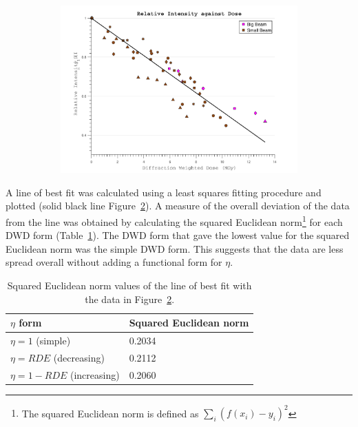 \begin{figure}
\ContinuedFloat
    \begin{subfigure}[b]{1\textwidth}
        \centering
        \includegraphics[width=\textwidth]{figures/dwd/reproduce_relint_DWDwrong.pdf}
        \caption{}
        \label{fig:Relative intensity - Decreasing Eta}
    \end{subfigure}
	\caption{}
	\label{fig:Relative intensity - DWD eta forms}
\end{figure}

A line of best fit was calculated using a least squares fitting procedure and plotted (solid black line Figure~\ref{fig:Relative intensity - DWD eta forms}).
A measure of the overall deviation of the data from the line was obtained by calculating the squared Euclidean norm\footnote{The squared Euclidean norm is defined as $\sum_i (f(x_i) - y_i)^2$} for each DWD form (Table~\ref{tab:Squared Euclidean norm values - Relative intensity fits}).
The DWD form that gave the lowest value for the squared Euclidean norm was the simple DWD form.
This suggests that the data are less spread overall without adding a functional form for $\eta$.
\begin{table}[ht!]
\small
\captionsetup{justification=centering}
	\caption{Squared Euclidean norm values of the line of best fit with the data in Figure~\ref{fig:Relative intensity - DWD eta forms}.}
	\centering
	\begin{tabular}{p{5cm} p{4.5cm}}
		$\eta$ form			                & Squared Euclidean norm    \\
		\hline
		$\eta = 1$ (simple)     			& 0.2034        \\
		$\eta = RDE$ (decreasing)     	    & 0.2112        \\
		$\eta = 1-RDE$ (increasing)    		& 0.2060       \\
		\hline
	\end{tabular}
	\label{tab:Squared Euclidean norm values - Relative intensity fits}
\end{table}

